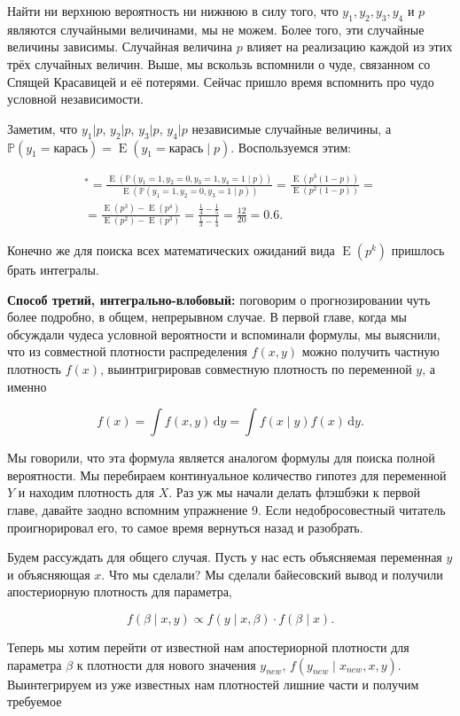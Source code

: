 \documentclass[12pt, a4paper, oneside]{extreport}
\DeclareMathOperator{\E}{\mathop{E}}
\def \b{\beta}
\def \mbb{\mathbb}
\def \PP{\mbb{P}}
\newcommand{\dx}[1]{\,\mathrm{d}#1} %
\theoremstyle{plain}              %
\theoremstyle{definition}         %
\begin{document}
Найти ни верхнюю вероятность ни нижнюю в силу того, что $y_1, y_2, y_3,y_4$ и $p$ являются случайными величинами, мы не можем. Более того, эти случайные величины зависимы. Случайная величина $p$ влияет на реализацию каждой из этих трёх случайных величин. Выше, мы вскользь вспомнили о чуде, связанном со Спящей Красавицей и её потерями. Сейчас пришло время вспомнить про чудо условной независимости. 

Заметим, что $y_1|p$,  $y_2|p$, $y_3|p$, $y_4|p$ независимые случайные величины, а $\PP(y_1 = \text{карась}) = \E(y_1 = \text{карась} \mid p)$. Воспользуемся этим:

\begin{multline*}
 ^* =  \frac{ \E(\PP(y_1 = 1,y_2 = 0,y_3 = 1,y_4=1 \mid p))}{\E(\PP(y_1 = 1,y_2 = 0,y_3=1 \mid p))} =  \frac{\E(p^3(1-p))}{\E(p^2(1-p))} = \\ =  \frac{\E(p^3) - \E(p^4)}{\E(p^2) - \E(p^3)} =  \frac{\frac{1}{4} - \frac{1}{5}}{\frac{1}{3} - \frac{1}{4}} = \frac{12}{20} = 0.6.
 \end{multline*}

Конечно же для поиска всех математических ожиданий вида $\E(p^k)$ пришлось брать интегралы.

\textbf{Способ третий, интегрально-влобовый:} поговорим о прогнозировании чуть более подробно, в общем, непрерывном случае. В первой главе, когда мы обсуждали чудеса условной вероятности и вспоминали формулы, мы выяснили, что из совместной плотности распределения $f(x,y)$ можно получить частную плотность $f(x)$, выинтригрировав совместную плотность по переменной $y$, а именно 

\[ f(x) = \int f(x,y) \dx{y} = \int f(x \mid y) f(x) \dx{y}.\]  

Мы говорили, что эта формула является аналогом формулы для поиска полной вероятности. Мы перебираем континуальное количество гипотез для переменной $Y$ и находим плотность для $X$.  Раз уж мы начали делать флэшбэки к первой главе, давайте заодно вспомним упражнение 9. Если недобросовестный читатель проигнорировал его, то самое время вернуться назад и разобрать. 

 Будем рассуждать для общего случая. Пусть у нас есть объясняемая переменная $y$ и объясняющая $x$. Что мы сделали? Мы сделали байесовский вывод и получили апостериорную плотность для параметра, 

\[ f(\b \mid x, y) \propto f(y \mid x, \b) \cdot f(\b \mid x).\]

Теперь мы хотим перейти от известной нам апостериорной плотности для параметра $\b$ к плотности для нового значения $y_{new}$, $f(y_{new} \mid x_{new},x,y)$. Выинтегрируем из уже известных нам плотностей лишние части и получим требуемое
\end{document}
